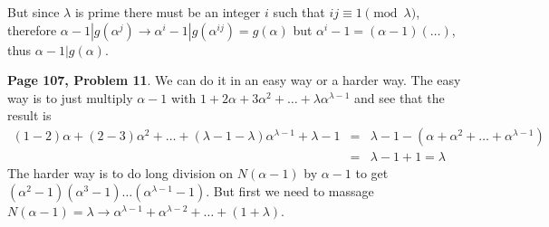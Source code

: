 \documentclass[aps,preprint,preprintnumbers,nofootinbib,showpacs,prd]{revtex4-1}
\newcommand{\nbea}{\begin{eqnarray*}}
\newcommand{\neea}{\end{eqnarray*}}
\begin{document}
But since $\lambda$ is prime there must be an integer $i$ such that $ij \equiv 1 \pmod{\lambda}$, therefore $\alpha - 1|g(\alpha^j) \to \alpha^i - 1 | g(\alpha^{ij}) = g(\alpha)$ but $\alpha^i - 1 = (\alpha - 1)(\dots)$, thus $\alpha - 1|g(\alpha)$.

{\bf Page 107, Problem 11}. We can do it in an easy way or a harder way. The easy way is to just multiply $\alpha - 1$ with $1 + 2\alpha + 3\alpha^2 + \dots + \lambda \alpha^{\lambda - 1}$ and see that the result is
%
\nbea
(1-2) \alpha + (2-3)\alpha^2 + \dots + (\lambda - 1 - \lambda)\alpha^{\lambda - 1} + \lambda - 1 & = & \lambda - 1 - (\alpha + \alpha^2 + \dots + \alpha^{\lambda - 1}) \\
& = & \lambda - 1 + 1 = \lambda
\neea
%
The harder way is to do long division on $N(\alpha - 1)$ by $\alpha - 1$ to get $(\alpha^2 - 1)(\alpha^3 - 1) \dots (\alpha^{\lambda - 1} - 1)$. But first we need to massage $N(\alpha - 1) = \lambda \to \alpha^{\lambda-1} + \alpha^{\lambda - 2} + \dots + (1 + \lambda)$.
\end{document}
